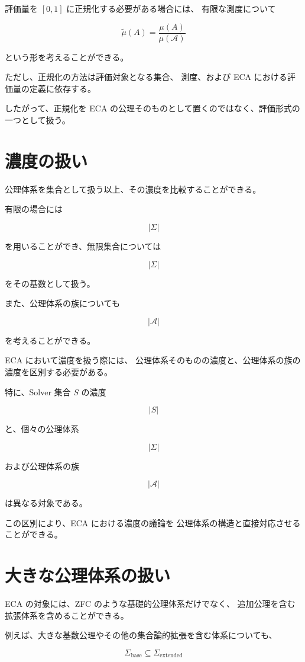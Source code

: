 \documentclass[12pt,a4paper]{article}
\begin{document}
評価量を $[0,1]$ に正規化する必要がある場合には、
有限な測度について

\[
\widetilde{\mu}(A)
=
\frac{\mu(A)}{\mu(\mathscr{A})}
\]

という形を考えることができる。

ただし、正規化の方法は評価対象となる集合、
測度、および ECA における評価量の定義に依存する。

したがって、正規化を ECA の公理そのものとして置くのではなく、評価形式の一つとして扱う。

\section{濃度の扱い}

公理体系を集合として扱う以上、その濃度を比較することができる。

有限の場合には

\[
|\Sigma|
\]

を用いることができ、無限集合については

\[
|\Sigma|
\]

をその基数として扱う。

また、公理体系の族についても

\[
|\mathscr{A}|
\]

を考えることができる。

ECA において濃度を扱う際には、
公理体系そのものの濃度と、公理体系の族の濃度を区別する必要がある。

特に、Solver 集合 $S$ の濃度

\[
|S|
\]

と、個々の公理体系

\[
|\Sigma|
\]

および公理体系の族

\[
|\mathscr{A}|
\]

は異なる対象である。

この区別により、ECA における濃度の議論を
公理体系の構造と直接対応させることができる。

\section{大きな公理体系の扱い}

ECA の対象には、ZFC のような基礎的公理体系だけでなく、
追加公理を含む拡張体系を含めることができる。

例えば、大きな基数公理やその他の集合論的拡張を含む体系についても、

\[
\Sigma_{\mathrm{base}}
\subseteq
\Sigma_{\mathrm{extended}}
\]
\end{document}
